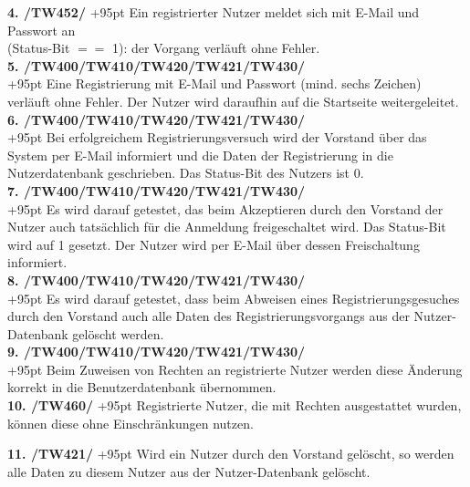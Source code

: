 \documentclass[fontsize = 12pt, paper = a4]{scrreprt}
\begin{document}
\textbf{4. /TW452/}
\hangindent+95pt 
\hspace*{5.5mm}
Ein registrierter Nutzer meldet sich mit E-Mail und Passwort an\\ (Status-Bit $==$ 1): der Vorgang verläuft ohne Fehler.\\
 
\textbf{5. /TW400/TW410/TW420/TW421/TW430/}\\
\hangindent+95pt 
Eine Registrierung mit E-Mail und Passwort (mind. sechs Zeichen) verläuft ohne Fehler. Der Nutzer wird daraufhin auf die Startseite weitergeleitet.\\

\textbf{6. /TW400/TW410/TW420/TW421/TW430/}\\
\hangindent+95pt 
Bei erfolgreichem Registrierungsversuch wird der Vorstand über das System per E-Mail  informiert und die Daten der Registrierung in die Nutzerdatenbank geschrieben. Das Status-Bit des Nutzers ist 0.\\

\textbf{7. /TW400/TW410/TW420/TW421/TW430/}\\
\hangindent+95pt 
Es wird darauf getestet, das beim Akzeptieren durch den Vorstand der Nutzer auch tatsächlich für die Anmeldung freigeschaltet wird. Das Status-Bit wird auf 1 gesetzt. Der Nutzer wird per E-Mail über dessen Freischaltung informiert. \\

\textbf{8. /TW400/TW410/TW420/TW421/TW430/}\\
\hangindent+95pt 
Es wird darauf getestet, dass beim Abweisen eines Registrierungsgesuches durch den Vorstand auch alle Daten des Registrierungsvorgangs aus der Nutzer-Datenbank gelöscht werden. \\

\textbf{9. /TW400/TW410/TW420/TW421/TW430/}\\
\hangindent+95pt 
Beim Zuweisen von Rechten an registrierte Nutzer werden diese Änderung korrekt in die Benutzerdatenbank übernommen.\\

\textbf{10. /TW460/}
\hangindent+95pt 
\hspace*{3.5mm}
Registrierte Nutzer, die mit Rechten ausgestattet wurden, können diese ohne Einschränkungen nutzen. \\

\newpage

\textbf{11. /TW421/}
\hangindent+95pt 
\hspace*{3.5mm}
Wird ein Nutzer durch den Vorstand gelöscht, so werden alle Daten zu diesem Nutzer aus der Nutzer-Datenbank gelöscht.\\
\end{document}
